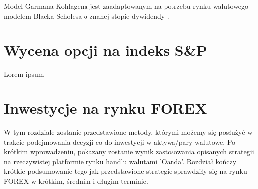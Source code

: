 \documentclass{pracamgr}
\begin{document}
Model Garmana-Kohlagena jest zaadaptowanym na potrzebu rynku walutowego modelem
Blacka-Scholesa o znanej stopie dywidendy . 


\chapter{Wycena opcji na indeks S\&P}\label{r:sp}
Lorem ipsum
 

\chapter{Inwestycje na rynku FOREX}
W tym rozdziale zostanie przedstawione metody, którymi możemy się posłużyć
w trakcie podejmowania decyzji co do inwestycji w aktywa/pary walutowe.
Po krótkim wprowadzeniu, pokazany zostanie wynik zastosowania opisanych 
strategii na rzeczywistej platformie rynku handlu walutami 'Oanda'.
Rozdział kończy krótkie podsumowanie tego jak przedstawione strategie 
sprawdziły się na rynku FOREX w krótkim, średnim i długim terminie. 
\end{document}
